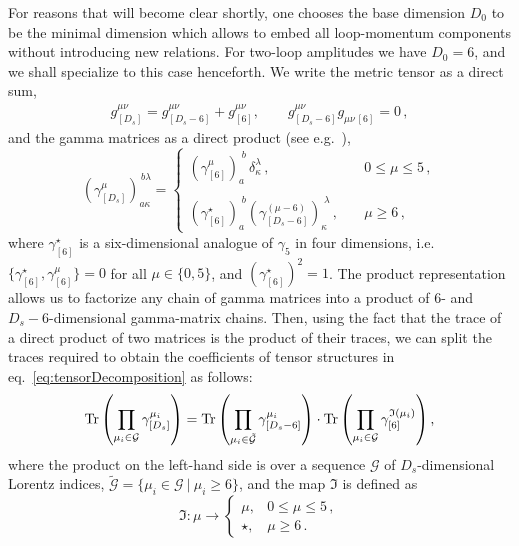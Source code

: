 For reasons that will become clear shortly, one chooses the base
dimension $D_0$ to be the minimal dimension which allows to embed 
all loop-momentum components without introducing new relations.
For two-loop amplitudes we have $D_0=6$, and we
shall specialize to this case henceforth. We write the metric tensor as
a direct sum,
  \begin{align}
    \label{eq:ds-split-metric}
    g^{\mu\nu}_{[D_s]}  = g^{\mu\nu}_{[D_s-6]} + g^{\mu\nu}_{[6]},  \qquad
    g^{\mu\nu}_{[D_s-6]}g^{\phantom{\mu\nu}}_{\mu\nu\,[6]} = 0\,,
  \end{align}
  and the gamma matrices as a direct product 
  (see e.g.~\cite{Collins:1984xc,Kreuzer:susylectures}),
\begin{equation}
  (\gamma_{[D_s]}^\mu)_{a\kappa}^{\,b\lambda}  = \left\{ 
    \begin{array}{ll} 
      \left(\gamma_{[6]}^\mu\right)_a^{\;b} \,
      \delta_\kappa^\lambda\,, &\quad  0\le\mu \le 5 \,,\\&\\
      \left(\gamma^\star_{[6]}\right)_a^{\;b} 
      \left(\gamma_{[D_s-6]}^{(\mu-6)}\right)_\kappa^{\;\lambda}\,, 
      &\quad \mu \geq 6 \,,
    \end{array}
    \right.
    \label{eq:ds-gamma}
\end{equation}
where $\gamma^\star_{[6]}$ is a six-dimensional analogue of $\gamma_5$ in four dimensions, i.e.
$\{\gamma^\star_{[6]},\gamma_{[6]}^\mu\} = 0$ for all $\mu \in \{0,5\}$, and $(\gamma^\star_{[6]})^2 = 1$.
The product representation allows us to factorize any chain of gamma matrices into a product of $6$- and $D_s-6$-dimensional gamma-matrix chains.
Then, using the fact that the trace of a direct product of two matrices is the product of their traces,
we can split the traces required to obtain the coefficients of tensor structures in eq.~\eqref{eq:tensorDecomposition}
as follows:
\begin{equation}
  \Tr\left(\prod_{\mu_i\in \mathcal{G}}\gamma^{\mu_i}_{[D_s]}\right) =
  \Tr\left(\prod_{\mu_i\in \tilde{\mathcal{G}}}\gamma^{\mu_i}_{[D_s-6]}\right) \cdot
  \Tr\left(\prod_{\mu_i\in \mathcal{G}}\gamma^{\mathfrak{I}(\mu_i)}_{[6]}\right),
  \label{eq:ds-split-traces}
\end{equation}
where the product on the left-hand side is over a sequence $\mathcal{G}$ of $D_s$-dimensional Lorentz indices,
$\tilde{\mathcal{G}} = \{ \mu_i \in \mathcal{G} ~\vert~ \mu_i \geq 6 \}$, and the map $\mathfrak{I}$ is defined as
\begin{equation}
  \mathfrak{I} : \mu \to
    \begin{cases}
      \mu, & 0\le\mu \le 5\,, \\
      \star, & \mu \geq 6\,.
    \end{cases}
\end{equation}
